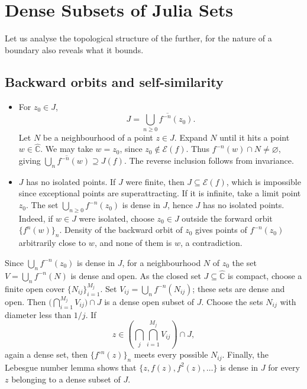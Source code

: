\documentclass[11pt,a4paper]{article}
\begin{document}
\section*{Dense Subsets of Julia Sets}
Let us analyse the topological structure of the  further, for the nature of a boundary also reveals what it bounds.
\subsection{Backward orbits and self-similarity}
\begin{itemize}
\item For $z_0\in J$,
\[
J=\overline{\bigcup_{n\ge0}f^{-n}(z_0)}.
\]
Let $N$ be a neighbourhood of a point $z\in J$. Expand $N$ until it hits a point $w\in\widehat{\mathbb C}$. We may take $w=z_0$, since $z_0\notin\mathcal E(f)$. Thus $f^{-n}(w)\cap N\ne\varnothing$, giving $\overline{\bigcup_n f^{-n}(w)}\supseteq J(f)$. The reverse inclusion follows from invariance.
\item $J$ has no isolated points. If $J$ were finite, then $J\subseteq\mathcal E(f)$, which is impossible since exceptional points are superattracting. If it is infinite, take a limit point $z_0$. The set $\bigcup_{n\ge0}f^{-n}(z_0)$ is dense in $J$, hence $J$ has no isolated points. Indeed, if $w\in J$ were isolated, choose $z_0\in J$ outside the forward orbit $\{f^n(w)\}_n$. Density of the backward orbit of $z_0$ gives points of $f^{-n}(z_0)$ arbitrarily close to $w$, and none of them is $w$, a contradiction.
\end{itemize}
\begin{remark}
Since $\bigcup_n f^{-n}(z_0)$ is dense in $J$, for a neighbourhood $N$ of $z_0$ the set $V=\bigcup_n f^{-n}(N)$ is dense and open. As the closed set $J\subseteq\widehat{\mathbb C}$ is compact, choose a finite open cover $\{N_{ij}\}_{i=1}^{M_j}$. Set $V_{ij}=\bigcup_n f^{-n}(N_{ij})$; these sets are dense and open. Then $\bigl(\bigcap_{i=1}^{M_j}V_{ij}\bigr)\cap J$ is a dense open subset of $J$. Choose the sets $N_{ij}$ with diameter less than $1/j$. If
\[
z\in\left(\bigcap_j\bigcap_{i=1}^{M_j}V_{ij}\right)\cap J,
\]
again a dense set, then $\{f^{\circ n}(z)\}_n$ meets every possible $N_{ij}$. Finally, the Lebesgue number lemma shows that $\{z,f(z),f^2(z),\ldots\}$ is dense in $J$ for every $z$ belonging to a dense subset of $J$.
\end{remark}
\end{document}
